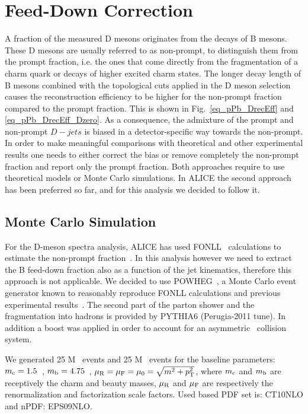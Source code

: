 \section{Feed-Down Correction}
\label{sect:FD}

A fraction of the measured D mesons originates from the decays of B mesons. These D mesons are usually referred to as non-prompt,
to distinguish them from the prompt fraction, i.e. the ones that come directly from the fragmentation of a charm quark or decays of higher excited charm states.
The longer decay length of B mesons combined with the topological cuts applied in the D meson selection causes the reconstruction efficiency 
to be higher for the non-prompt fraction compared to the prompt fraction. This is shown in Fig.~\ref{eq_pPb_DrecEff} and \ref{eq_pPb_DrecEff_Dzero}.
As a consequence, the admixture of the prompt and non-prompt $D-jets$ is biased in a detector-specific way towards the non-prompt.
In order to make meaningful comparisons with theoretical and other experimental results one needs to either correct the bias or remove completely the non-prompt fraction and report only the prompt fraction. 
Both approaches require to use theoretical models or Monte Carlo simulations.
In ALICE the second approach has been preferred so far, and for this analysis we decided to follow it.

\subsection{Monte Carlo Simulation}

For the D-meson spectra analysis, ALICE has used FONLL~\cite{Cacciari:1998} calculations to estimate the non-prompt fraction~\cite{ALICE:2012d, ALICE:2014d, ALICE:2016a}.
In this analysis however we need to extract the B feed-down fraction also as a function of the jet kinematics, therefore this approach is not applicable.
We decided to use POWHEG~\cite{Alioli:2010}, a Monte Carlo event generator known to reasonably reproduce FONLL calculations and previous experimental results~\cite{Cacciari:2012b}.
The second part of the parton shower and the fragmentation into hadrons is provided by PYTHIA6 (Perugia-2011 tune). In addition a boost was applied in order to account for an asymmetric \pPb\ collision system. 

We generated 25 M \ccbar\ events and 25 M \bbbar\ events for the baseline parameters: 
$m_{\rm c} = 1.5$~\GeVcsq, $m_{\rm b} = 4.75$~\GeVcsq, $\mu_{\rm R} = \mu_{\rm F} =\mu_{0} = \sqrt{m^2+p_{\rm T}^2}$,
where $m_{\rm c}$ and $m_{\rm b}$ are receptively the charm and beauty masses, $\mu_{\rm R}$ and $\mu_{\rm F}$ are respectively the renormalization and factorization scale factors.  Used based PDF set is: CT10NLO and nPDF: EPS09NLO.

